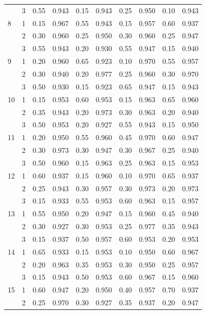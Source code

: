 \begin{longtable}{llcccccccc}
   & 3 & 0.55 & 0.943 & 0.15 & 0.943 & 0.25 & 0.950 & 0.10 & 0.943 \\ 
  8 & 1 & 0.15 & 0.967 & 0.55 & 0.943 & 0.15 & 0.957 & 0.60 & 0.937 \\ 
   & 2 & 0.30 & 0.960 & 0.25 & 0.950 & 0.30 & 0.960 & 0.25 & 0.947 \\ 
   & 3 & 0.55 & 0.943 & 0.20 & 0.930 & 0.55 & 0.947 & 0.15 & 0.940 \\ 
  9 & 1 & 0.20 & 0.960 & 0.65 & 0.923 & 0.10 & 0.970 & 0.55 & 0.957 \\ 
   & 2 & 0.30 & 0.940 & 0.20 & 0.977 & 0.25 & 0.960 & 0.30 & 0.970 \\ 
   & 3 & 0.50 & 0.930 & 0.15 & 0.923 & 0.65 & 0.947 & 0.15 & 0.943 \\ 
  10 & 1 & 0.15 & 0.953 & 0.60 & 0.953 & 0.15 & 0.963 & 0.65 & 0.960 \\ 
   & 2 & 0.35 & 0.943 & 0.20 & 0.973 & 0.30 & 0.963 & 0.20 & 0.940 \\ 
   & 3 & 0.50 & 0.953 & 0.20 & 0.927 & 0.55 & 0.943 & 0.15 & 0.950 \\ 
  11 & 1 & 0.20 & 0.950 & 0.55 & 0.960 & 0.45 & 0.970 & 0.60 & 0.947 \\ 
   & 2 & 0.30 & 0.973 & 0.30 & 0.947 & 0.30 & 0.967 & 0.25 & 0.940 \\ 
   & 3 & 0.50 & 0.960 & 0.15 & 0.963 & 0.25 & 0.963 & 0.15 & 0.953 \\ 
  12 & 1 & 0.60 & 0.937 & 0.15 & 0.960 & 0.10 & 0.970 & 0.65 & 0.937 \\ 
   & 2 & 0.25 & 0.943 & 0.30 & 0.957 & 0.30 & 0.973 & 0.20 & 0.973 \\ 
   & 3 & 0.15 & 0.933 & 0.55 & 0.953 & 0.60 & 0.963 & 0.15 & 0.957 \\ 
  13 & 1 & 0.55 & 0.950 & 0.20 & 0.947 & 0.15 & 0.960 & 0.45 & 0.940 \\ 
   & 2 & 0.30 & 0.927 & 0.30 & 0.953 & 0.25 & 0.977 & 0.35 & 0.943 \\ 
   & 3 & 0.15 & 0.937 & 0.50 & 0.957 & 0.60 & 0.953 & 0.20 & 0.953 \\ 
  14 & 1 & 0.65 & 0.933 & 0.15 & 0.953 & 0.10 & 0.950 & 0.60 & 0.967 \\ 
   & 2 & 0.20 & 0.963 & 0.35 & 0.953 & 0.30 & 0.950 & 0.25 & 0.957 \\ 
   & 3 & 0.15 & 0.943 & 0.50 & 0.953 & 0.60 & 0.967 & 0.15 & 0.960 \\ 
  15 & 1 & 0.60 & 0.947 & 0.20 & 0.950 & 0.40 & 0.957 & 0.70 & 0.937 \\ 
   & 2 & 0.25 & 0.970 & 0.30 & 0.927 & 0.35 & 0.937 & 0.20 & 0.947 \\ 

\end{longtable}
